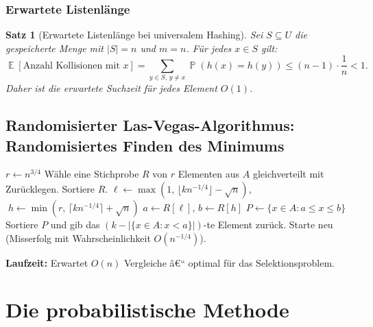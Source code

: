 ﻿\documentclass[12pt,a4paper]{article}
\theoremstyle{definition}
\theoremstyle{plain}
\newtheorem{satz}{Satz}[section]
\theoremstyle{remark}
\DeclareMathOperator{\E}{\mathbb{E}}
\DeclareMathOperator{\Prob}{\mathbb{P}}
\begin{document}
\subsubsection{Erwartete Listenlänge}

\begin{satz}[Erwartete Listenlänge bei universalem Hashing]\label{satz:hashew}
  Sei $S \subseteq U$ die gespeicherte Menge mit $|S| = n$ und $m = n$.
  Für jedes $x \in S$ gilt:
  \[
    \E\!\left[\text{Anzahl Kollisionen mit }x\right]
    = \sum_{y \in S,\, y \neq x} \Prob(h(x) = h(y))
    \leq (n-1) \cdot \frac{1}{n} < 1.
  \]
  Daher ist die erwartete Suchzeit für jedes Element $O(1)$.
\end{satz}

\subsection{Randomisierter Las-Vegas-Algorithmus: Randomisiertes Finden des Minimums}
\label{subsec:randmin}

\begin{algorithm}[H]
  \caption{Randomisiertes Minimum-Finden (LazySelect)}
  \label{alg:lazyselect}
  \begin{algorithmic}[1]
    \State $r \gets n^{3/4}$
    \State Wähle eine Stichprobe $R$ von $r$ Elementen aus $A$ gleichverteilt
           mit Zurücklegen.
    \State Sortiere $R$.
    \State $\ell \gets \max\!\left(1,\, \lfloor kn^{-1/4} \rfloor - \sqrt{n}\right)$,
           $\;h \gets \min\!\left(r,\, \lceil kn^{-1/4} \rceil + \sqrt{n}\right)$
    \State $a \gets R[\ell]$, $b \gets R[h]$
    \State $P \gets \{x \in A : a \leq x \leq b\}$
      \State Sortiere $P$ und gib das $(k - |\{x \in A : x < a\}|)$-te Element zurück.
    \Else
      \State Starte neu (Misserfolg mit Wahrscheinlichkeit $O(n^{-1/4})$).
    \EndIf
  \end{algorithmic}
\end{algorithm}

\textbf{Laufzeit:} Erwartet $O(n)$ Vergleiche â€“ optimal für das Selektionsproblem.

\section{Die probabilistische Methode}
\label{sec:probmethode}
\end{document}
